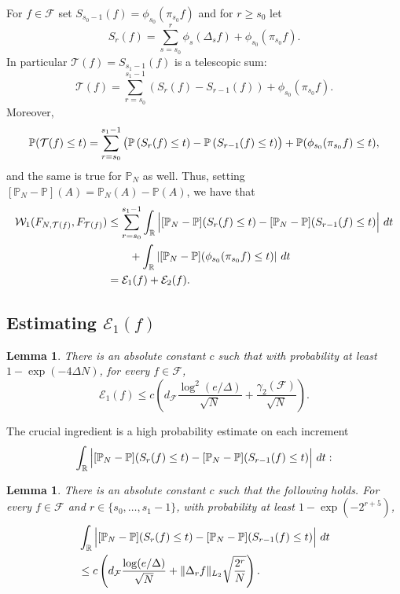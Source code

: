 \documentclass[11pt]{amsart}
\newcommand{\R}{\mathbb{R}}
\newcommand{\W}{\mathcal{W}}
\newtheorem{lemma}[theorem]{Lemma}
\theoremstyle{definition}
\renewcommand{\P}{\mathbb{P}}
\numberwithin{equation}{section}
\begin{document}
For $f\in\mathcal{F}$ set $S_{s_0-1}(f) = \phi_{s_{0}}(\pi_{s_{0}}f)$ and for $r\geq s_{0}$ let
\[ S_{r}(f) =  \sum_{s=s_{0}}^{r} \phi_{s}(\Delta_{s}f) +  \phi_{s_{0}}(\pi_{s_{0}}f).\]
In particular $\mathcal{T}(f)=S_{s_{1}-1}(f)$ is a telescopic sum:
\[\mathcal{T}(f) =      \sum_{r=s_{0}}^{s_{1}-1} \left( S_{r}(f)-S_{r-1}(f)  \right) +  \phi_{s_{0}}(\pi_{s_{0}}f) .\]
Moreover,
\[ \P(  \mathcal{T}(f)\leq t) 
= \sum_{r=s_{0}}^{s_{1}-1}  \left( \vphantom{\big(}\P\left(  S_{r}(f) \leq t\right)  -  \P\left( S_{r-1}(f) \leq t\right) \right) + \P(  \phi_{s_{0}}(\pi_{s_{0}}f)  \leq t)  ,\] 
and the same is true for $\P_{N}$ as well.
Thus, setting $[\P_{N}-\P](A) = \P_{N}(A)-\P(A)$, we have that
\begin{align}
\label{eq:split.W}
\begin{split}
\W_{1}(F_{N, \mathcal{T}(f)}, F_{ \mathcal{T}(f) } ) 
& \leq \sum_{r=s_{0}}^{s_{1}-1} \int_{\R} \left| \vphantom{\P^{(a)}}   [\P_{N}-\P]( S_{r}(f)\leq t)  - [\P_{N}-\P]( S_{r-1}(f) \leq t) \right| \,dt \\
&\qquad +\int_{\R} \left| [\P_{N}-\P]( \phi_{s_{0}}(\pi_{s_{0}}f )\leq t)  \right| \,dt   \\
& =\mathcal{E}_{1}(f) + \mathcal{E}_{2}(f).
\end{split}
\end{align}



\subsection{Estimating $\mathcal{E}_{1}(f)$}


\begin{lemma}
\label{prop:main.summed.up}
	There is an absolute constant $c$ such that with probability at least $1-\exp(-4\Delta N)$, for every $f\in\mathcal{F}$, 
	\[ \mathcal{E}_{1}(f)
	 \leq 
	 c \left(   d_{\mathcal{F}}  \frac{  \log^{2}(e/\Delta)}{\sqrt N} + \frac{\gamma_{2}(\mathcal{F})}{\sqrt N} \right).\] 
\end{lemma}


The crucial ingredient is a high probability estimate on each increment 
\[\int_{\R} \left| \vphantom{\P^{(a)}}   [\P_{N}-\P]( S_{r} (f)\leq t)  - [\P_{N}-\P]( S_{r-1} (f)\leq t) \right| \,dt :\]


\begin{lemma}
\label{prop:main}
	There is an absolute constant $c$ such that the following holds.
	For every $f\in\mathcal{F}$ and  $r\in\{s_{0},\dots,s_{1}-1\}$, with probability at least $1-\exp(-2^{r+5})$, 
	\begin{align}
	\label{eq:main.prop.statement}
	\begin{split}
	& \int_{\R} \left| \vphantom{\P^{(a)}}   [\P_{N}-\P]( S_{r} (f)\leq t)  - [\P_{N}-\P]( S_{r-1} (f)\leq t) \right| \,dt \\
	& \leq  c \left(  d_{\mathcal{F}}\frac{  \log(e/\Delta )}{\sqrt N} + \|\Delta_{r} f\|_{L_{2}}  \sqrt{\frac{2^{r}}{N}} \right).
	\end{split}
	\end{align}
\end{lemma}
\end{document}
